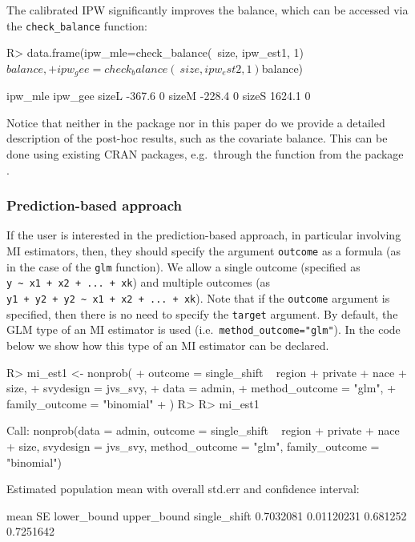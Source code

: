 \documentclass[
]{jss}
\begin{document}
The calibrated IPW significantly improves the balance, which can be
accessed via the \texttt{check\_balance} function:

\begin{CodeChunk}
\begin{CodeInput}
R> data.frame(ipw_mle=check_balance(~size, ipw_est1, 1)$balance,
+            ipw_gee=check_balance(~size, ipw_est2, 1)$balance)
\end{CodeInput}
\begin{CodeOutput}
      ipw_mle ipw_gee
sizeL  -367.6       0
sizeM  -228.4       0
sizeS  1624.1       0
\end{CodeOutput}
\end{CodeChunk}

Notice that neither in the package nor in this paper do we provide a
detailed description of the post-hoc results, such as the covariate
balance. This can be done using existing CRAN packages, e.g.~through the
 function from the  package \citep{cobalt}.

\subsubsection{Prediction-based
approach}\label{prediction-based-approach}

If the user is interested in the prediction-based approach, in
particular involving MI estimators, then, they should specify the
argument \texttt{outcome} as a formula (as in the case of the
\texttt{glm} function). We allow a single outcome (specified as
\texttt{y\ \textasciitilde{}\ x1\ +\ x2\ +\ ...\ +\ xk}) and multiple
outcomes (as
\texttt{y1\ +\ y2\ +\ y2\ \textasciitilde{}\ x1\ +\ x2\ +\ ...\ +\ xk}).
Note that if the \texttt{outcome} argument is specified, then there is
no need to specify the \texttt{target} argument. By default, the GLM
type of an MI estimator is used (i.e.~\texttt{method\_outcome="glm"}).
In the code below we show how this type of an MI estimator can be
declared.

\begin{CodeChunk}
\begin{CodeInput}
R> mi_est1 <- nonprob(
+   outcome = single_shift ~ region + private + nace + size,
+   svydesign = jvs_svy,
+   data = admin,
+   method_outcome = "glm",
+   family_outcome = "binomial"
+ )
R> 
R> mi_est1
\end{CodeInput}
\begin{CodeOutput}

Call:
nonprob(data = admin, outcome = single_shift ~ region + private + 
    nace + size, svydesign = jvs_svy, method_outcome = "glm", 
    family_outcome = "binomial")

Estimated population mean with overall std.err and confidence interval:

                  mean         SE lower_bound upper_bound
single_shift 0.7032081 0.01120231    0.681252   0.7251642
\end{CodeOutput}
\end{CodeChunk}
\end{document}
